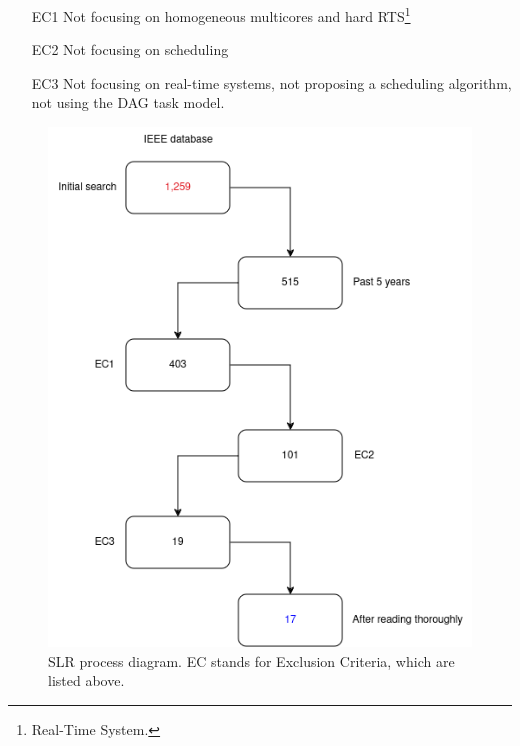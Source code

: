 \begin{itemize}{}{}
    \item [EC1] Not focusing on homogeneous multicores and hard RTS\footnote{Real-Time System.}
    
    \item [EC2] Not focusing on scheduling

    \item [EC3] Not focusing on real-time systems, not proposing a scheduling algorithm, not using the DAG task model.
\end{itemize}

\begin{figure}[htbp]
    \centering
    \includegraphics[width=\linewidth]{images/slr_process.png}
    \caption{SLR process diagram. EC stands for Exclusion Criteria,
    which are listed above.}
    \label{fig:slr_process}
\end{figure}


